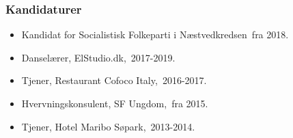 \documentclass[11pt, a4paper]{awesome-cv}
\begin{document}
\begin{cvletter}
\subsubsection*{Kandidaturer}
\begin{itemize}
\item Kandidat for Socialistisk Folkeparti i Næstvedkredsen fra 2018.
\end{itemize}
\begin{itemize}
\item Danselærer, ElStudio.dk, 2017-2019.
\item Tjener, Restaurant Cofoco Italy, 2016-2017.
\item Hvervningskonsulent, SF Ungdom, fra 2015.
\item Tjener, Hotel Maribo Søpark, 2013-2014.
\end{itemize}
\end{cvletter}
\end{document}

